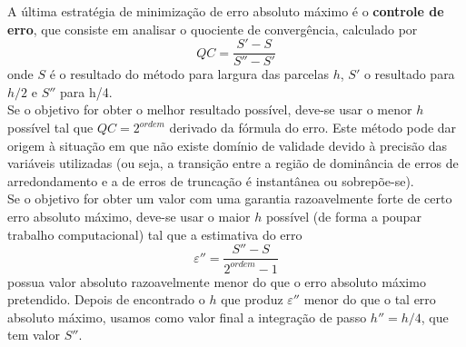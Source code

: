 {A última estratégia de minimização de erro absoluto máximo é o \textbf{controle de erro}, que consiste em analisar o quociente de convergência, calculado por
\begin{equation*}
	QC=\frac{S'-S}{S''-S'}
\end{equation*}
onde $S$ é o resultado do método para largura das parcelas $h$, $S'$ o resultado para $h/2$ e $S''$ para h/4.\\ Se o objetivo for obter o melhor resultado possível, deve-se usar o menor $h$ possível tal que $QC = 2^{ordem}$ derivado da fórmula do erro. Este método pode dar origem à situação em que não existe domínio de validade devido à precisão das variáveis utilizadas (ou seja, a transição entre a região de dominância de erros de arredondamento e a de erros de truncação é instantânea ou sobrepõe-se).\\
Se o objetivo for obter um valor com uma garantia razoavelmente forte de certo erro absoluto máximo, deve-se usar o maior $h$ possível (de forma a poupar trabalho computacional) tal que a estimativa do erro
\begin{equation*}
\varepsilon '' = \frac{S''-S}{2^{ordem}-1}
\end{equation*}
possua valor absoluto razoavelmente menor do que o erro absoluto máximo pretendido. Depois de encontrado o $h$ que produz $\varepsilon ''$ menor do que o tal erro absoluto máximo, usamos como valor final a integração de passo $h''=h/4$, que tem valor $S''$.
}
